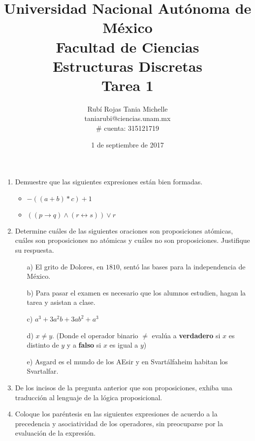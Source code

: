 \documentclass[letterpaper,11pt]{article}
\title{Universidad Nacional Autónoma de México \\
       Facultad de Ciencias \\
       Estructuras Discretas \\ 
       Tarea 1}
\author{Rubí Rojas Tania Michelle \\
        taniarubi@ciencias.unam.mx \\
        \# cuenta: 315121719}
\date{1 de septiembre de 2017}
\begin{document}
\maketitle

\begin{enumerate}
    \item Demuestre que las siguientes expresiones están bien formadas.    
    
    \begin{itemize}
        \item $- ((a + b) * c) + 1$
        \item $((p \rightarrow q) \land (r \leftrightarrow s)) \lor r$
    \end{itemize}

    \item Determine cuáles de las siguientes oraciones son proposiciones 
    atómicas, cuáles son proposiciones no atómicas y cuáles no son 
    proposiciones. Justifique su respuesta. 

    \begin{itemize}
        \item[a)] El grito de Dolores, en $1810$, sentó las bases para la 
        independencia de México.
        \item[b)] Para pasar el examen es necesario que los alumnos estudien, hagan
        la tarea y asistan a clase.
        \item[c)] $a^{3} + 3a^{2}b + 3ab^{2} + a^{3}$
        \item[d)] $x \neq y$. (Donde el operador binario $\neq$ evalúa a 
        \textbf{verdadero} si $x$ es distinto de $y$ y a \textbf{falso} si 
        $x$ es igual a $y$)
        \item[e)] Asgard es el mundo de los AEsir y en Svartálfaheim habitan los 
        Svartalfar.
    \end{itemize}

    \item De los incisos de la pregunta anterior que son proposiciones, exhiba
    una traducción al lenguaje de la lógica proposicional.

    \item Coloque los paréntesis en las siguientes expresiones de acuerdo a la 
    precedencia y asociatividad de los operadores, sin preocuparse por la
    evaluación de la expresión.


\end{enumerate}
\end{document}
